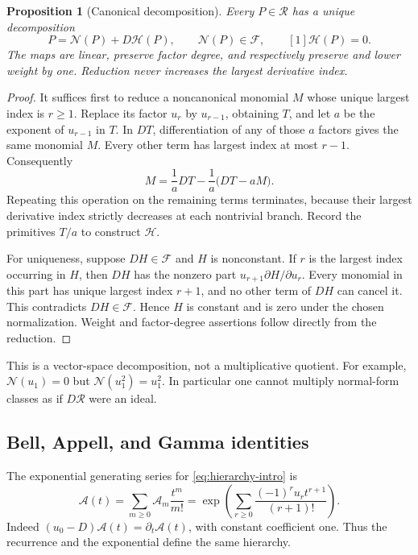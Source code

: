 \documentclass[11pt,letterpaper]{article}
\numberwithin{equation}{section}
\theoremstyle{plain}
\newtheorem{proposition}[theorem]{Proposition}
\theoremstyle{definition}
\theoremstyle{remark}
\newcommand{\Rcal}{\mathscr R}\newcommand{\Fcal}{\mathscr F}
\newcommand{\Ac}{\mathcal A}\newcommand{\Nc}{\mathcal N}\newcommand{\Hc}{\mathcal H}
\begin{document}
\begin{proposition}[Canonical decomposition]\label{prop:normal}
Every $P\in\Rcal$ has a unique decomposition
\begin{equation}\label{eq:normal}
 P=\Nc(P)+D\Hc(P),\qquad \Nc(P)\in\Fcal,
 \qquad [1]\Hc(P)=0.
\end{equation}
The maps are linear, preserve factor degree, and respectively preserve and lower weight by one. Reduction never increases the largest derivative index.
\end{proposition}

\begin{proof}
It suffices first to reduce a noncanonical monomial $M$ whose unique largest index is $r\ge1$. Replace its factor $u_r$ by $u_{r-1}$, obtaining $T$, and let $a$ be the exponent of $u_{r-1}$ in $T$. In $DT$, differentiation of any of those $a$ factors gives the same monomial $M$. Every other term has largest index at most $r-1$. Consequently
\[
 M=\frac1aDT-\frac1a\bigl(DT-aM\bigr).
\]
Repeating this operation on the remaining terms terminates, because their largest derivative index strictly decreases at each nontrivial branch. Record the primitives $T/a$ to construct $\Hc$.

For uniqueness, suppose $DH\in\Fcal$ and $H$ is nonconstant. If $r$ is the largest index occurring in $H$, then $DH$ has the nonzero part
$u_{r+1}\partial H/\partial u_r$. Every monomial in this part has unique largest index $r+1$, and no other term of $DH$ can cancel it. This contradicts $DH\in\Fcal$. Hence $H$ is constant and is zero under the chosen normalization. Weight and factor-degree assertions follow directly from the reduction.
\end{proof}

This is a vector-space decomposition, not a multiplicative quotient. For example, $\Nc(u_1)=0$ but $\Nc(u_1^2)=u_1^2$. In particular one cannot multiply normal-form classes as if $D\Rcal$ were an ideal.

\subsection{Bell, Appell, and Gamma identities}

The exponential generating series for \eqref{eq:hierarchy-intro} is
\begin{equation}\label{eq:Bell}
 \Ac(t)=\sum_{m\ge0}\Ac_m\frac{t^m}{m!}
 =\exp\left(\sum_{r\ge0}\frac{(-1)^r u_rt^{r+1}}{(r+1)!}\right).
\end{equation}
Indeed $(u_0-D)\Ac(t)=\partial_t\Ac(t)$, with constant coefficient one. Thus the recurrence and the exponential define the same hierarchy.
\end{document}
